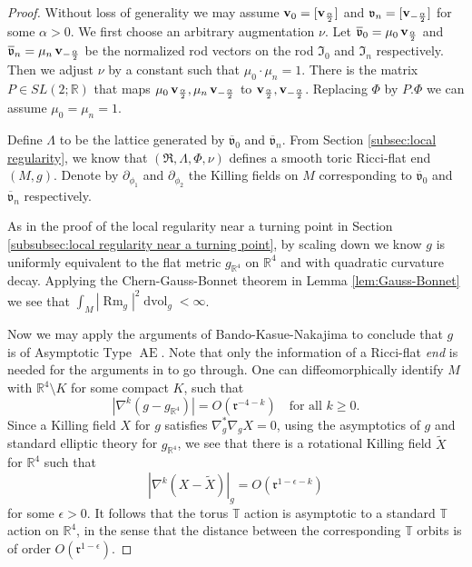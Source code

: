 \documentclass[a4paper,11pt]{amsart}
\theoremstyle{definition}
\numberwithin{equation}{section}
\newcommand{\p}{\partial}
\newcommand{\R}{\mathbb{R}}
\newcommand{\mv} {\mathfrak v}
\newcommand{\mI} {\mathfrak I}
\newcommand{\mR} {\mathfrak R}
\DeclareMathOperator{\dvol}{dvol}
\DeclareMathOperator{\Rm}{Rm}
\DeclareMathOperator{\bv}{{\bf v}}
\DeclareMathOperator{\Ae}{AE}
\begin{document}
\begin{proof}
  Without loss of generality we may assume $\bv_0=[\bv_{\frac{\alpha}{2}}]$ and $\mv_n=[\bv_{-\frac{\alpha}{2}}]$ for some $\alpha>0$.
  We first choose an arbitrary augmentation $\nu$. Let $\overline{\mv}_0=\mu_0\bv_{\frac{\alpha}{2}}$ and $\overline{\mv}_n=\mu_n \bv_{-\frac{\alpha}{2}}$ be the normalized rod vectors on the rod $\mI_0$ and $\mI_n$ respectively. Then we adjust $\nu$ by a constant such that $\mu_0\cdot \mu_n=1$. There is the matrix $P\in SL(2;\mathbb{R})$ that maps $\mu_0\bv_{\frac{\alpha}{2}},\mu_n\bv_{-\frac{\alpha}{2}}$ to $\bv_{\frac{\alpha}{2}},\bv_{-\frac{\alpha}{2}}$. 
  Replacing $\Phi$ by $P. \Phi$ we can assume $\mu_0=\mu_n=1$.
  
  Define $\Lambda$ to be the lattice generated by $\overline{\mv}_0$ and $\overline{\mv}_n$. 
     From Section \ref{subsec:local regularity}, we know that $(\mR, \Lambda, \Phi, \nu)$ defines a smooth toric Ricci-flat end $(M, g)$. Denote by $\p_{\phi_1}$ and $\p_{\phi_2}$ the Killing fields on $M$ corresponding to $\overline{\mv}_0$ and $\overline{\mv}_n$ respectively.

    As in the proof of the local regularity near a turning point in Section \ref{subsubsec:local regularity near a turning point}, by scaling down 
    we know  $g$ is uniformly equivalent to the flat metric $g_{\R^4}$ on $\R^4$ and with quadratic curvature decay.  Applying the Chern-Gauss-Bonnet theorem in Lemma \ref{lem:Gauss-Bonnet} we see that $\int_{M}|\Rm_g|^2\dvol_g<\infty$. 

   Now we may apply the arguments of Bando-Kasue-Nakajima \cite{BKN} to conclude that \( g \) is of Asymptotic Type \( \Ae \). Note that only the information of a Ricci-flat \emph{end} is needed for the arguments in \cite{BKN} to go through. One can diffeomorphically identify \( M \) with \( \mathbb{R}^4 \setminus K \) for some compact \( K \), such that  
\[
|\nabla^k(g - g_{\mathbb{R}^4})| = O(\mathfrak{r}^{-4-k}) \quad \text{for all } k \geq 0.
\]
Since a Killing field \( X \) for \( g \) satisfies \( \nabla_g^* \nabla_g X = 0 \), using the asymptotics of \( g \) and standard elliptic theory for \( g_{\mathbb{R}^4} \), we see that there is a rotational Killing field \( \widetilde{X} \) for \( \mathbb{R}^4 \) such that  
\[
|\nabla^k (X - \widetilde{X})|_g = O(\mathfrak{r}^{1-\epsilon-k})
\]
for some \( \epsilon > 0 \). It follows that the torus \( \mathbb{T} \) action is asymptotic to a standard \( \mathbb{T} \) action on \( \mathbb{R}^4 \), in the sense that the distance between the corresponding \( \mathbb{T} \) orbits is of order \( O(\mathfrak{r}^{1-\epsilon}) \).  


\end{proof}
\end{document}
